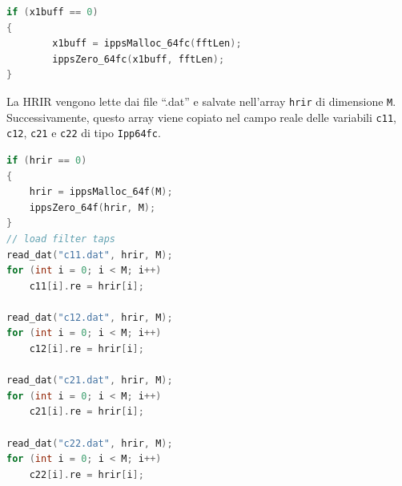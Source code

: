 \documentclass[12pt,a4paper,titlepage]{article}
\begin{document}
\begin{lstlisting}[language=cpp, label=code:allocazione_fd, caption = Allocazione della variabile \texttt{x1buff} nella funzione \texttt{LEPlugin\_Init}, breaklines = false, captionpos = b]
if (x1buff == 0)
{
		x1buff = ippsMalloc_64fc(fftLen);
		ippsZero_64fc(x1buff, fftLen);
}
\end{lstlisting}

La HRIR vengono lette dai file ``.dat'' e salvate nell'array \texttt{hrir} di dimensione \texttt{M}. Successivamente, questo array viene copiato nel campo reale delle variabili \texttt{c11}, \texttt{c12}, \texttt{c21} e \texttt{c22} di tipo \texttt{Ipp64fc}.

\begin{lstlisting}[language=cpp, label=code:lettura_hrir, caption = Lettura delle HRIR, breaklines = false, captionpos = b]
if (hrir == 0)
{
	hrir = ippsMalloc_64f(M);
	ippsZero_64f(hrir, M);
}
// load filter taps
read_dat("c11.dat", hrir, M);
for (int i = 0; i < M; i++)
	c11[i].re = hrir[i];

read_dat("c12.dat", hrir, M);
for (int i = 0; i < M; i++)
	c12[i].re = hrir[i];

read_dat("c21.dat", hrir, M);
for (int i = 0; i < M; i++)
	c21[i].re = hrir[i];

read_dat("c22.dat", hrir, M);
for (int i = 0; i < M; i++)
	c22[i].re = hrir[i];
\end{lstlisting}
	
\end{document}
